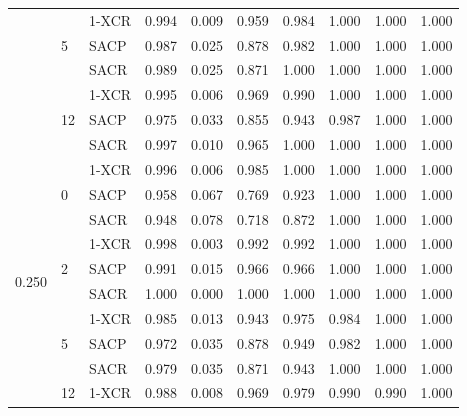 \begin{longtable}[c]{|l|l|l|l|l|l|l|l|l|l|}
                        & \multirow{3}{*}{5}  & 1-XCR  & 0.994 & 0.009 & 0.959 & 0.984 & 1.000 & 1.000 & 1.000 \\ \cline{3-10} 
                        &                     & SACP   & 0.987 & 0.025 & 0.878 & 0.982 & 1.000 & 1.000 & 1.000 \\ \cline{3-10} 
                        &                     & SACR   & 0.989 & 0.025 & 0.871 & 1.000 & 1.000 & 1.000 & 1.000 \\ \cline{2-10} 
                        & \multirow{3}{*}{12} & 1-XCR  & 0.995 & 0.006 & 0.969 & 0.990 & 1.000 & 1.000 & 1.000 \\ \cline{3-10} 
                        &                     & SACP   & 0.975 & 0.033 & 0.855 & 0.943 & 0.987 & 1.000 & 1.000 \\ \cline{3-10} 
                        &                     & SACR   & 0.997 & 0.010 & 0.965 & 1.000 & 1.000 & 1.000 & 1.000 \\ \hline
\multirow{12}{*}{0.250} & \multirow{3}{*}{0}  & 1-XCR  & 0.996 & 0.006 & 0.985 & 1.000 & 1.000 & 1.000 & 1.000 \\ \cline{3-10} 
                        &                     & SACP   & 0.958 & 0.067 & 0.769 & 0.923 & 1.000 & 1.000 & 1.000 \\ \cline{3-10} 
                        &                     & SACR   & 0.948 & 0.078 & 0.718 & 0.872 & 1.000 & 1.000 & 1.000 \\ \cline{2-10} 
                        & \multirow{3}{*}{2}  & 1-XCR  & 0.998 & 0.003 & 0.992 & 0.992 & 1.000 & 1.000 & 1.000 \\ \cline{3-10} 
                        &                     & SACP   & 0.991 & 0.015 & 0.966 & 0.966 & 1.000 & 1.000 & 1.000 \\ \cline{3-10} 
                        &                     & SACR   & 1.000 & 0.000 & 1.000 & 1.000 & 1.000 & 1.000 & 1.000 \\ \cline{2-10} 
                        & \multirow{3}{*}{5}  & 1-XCR  & 0.985 & 0.013 & 0.943 & 0.975 & 0.984 & 1.000 & 1.000 \\ \cline{3-10} 
                        &                     & SACP   & 0.972 & 0.035 & 0.878 & 0.949 & 0.982 & 1.000 & 1.000 \\ \cline{3-10} 
                        &                     & SACR   & 0.979 & 0.035 & 0.871 & 0.943 & 1.000 & 1.000 & 1.000 \\ \cline{2-10} 
                        & \multirow{3}{*}{12} & 1-XCR  & 0.988 & 0.008 & 0.969 & 0.979 & 0.990 & 0.990 & 1.000 \\ \cline{3-10} 

\end{longtable}
